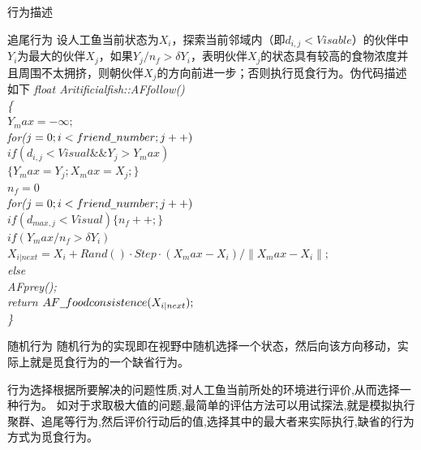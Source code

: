 \documentclass[UTF8]{ctexart}
\begin{document}
\begin{section}
\begin{subsection}{行为描述}
\begin{subsubsection}{追尾行为}
设人工鱼当前状态为$X_i$，探索当前邻域内（即$d_{i,j}<Visable$）的伙伴中$Y_i$为最大的伙伴$X_j$，如果$Y_j/n_f>\delta Y_i$，表明伙伴$X_j$的状态具有较高的食物浓度并且周围不太拥挤，则朝伙伴$X_j$的方向前进一步；否则执行觅食行为。伪代码描述如下			
\flushleft\scriptsize{\emph{float Aritificial\underline{\hspace{0.5em}}fish::AF\underline{\hspace{0.5em}}follow() \\ {\{} \\ {\qquad $Y_max=-\infty;$} \\ {\qquad for($j=0;i<friend\underline{\hspace{0.5em}}number;j++)$} \\ {\qquad\qquad $if(d_{i,j}<Visual \&\& Y_j>Y_max)$} \\ {\qquad\qquad\qquad $\{ Y_max=Y_j; X_max=X_j; \}$ }\\{\qquad $n_f=0$}\\{\qquad for($j=0;i<friend\underline{\hspace{0.5em}}number;j++)$}\\{\qquad\qquad $if(d_{max,j}<Visual) \{ n_f++;\} $}\\{\qquad $if (Y_max/n_f>\delta Y_i)$}\\{\qquad\qquad $X_{i|next}=X_i+Rand()·Step·(X_max-X_i)/\lVert X_max-X_i\rVert;$}\\{\qquad else}\\{\qquad\qquad AF\underline{\hspace{0.5em}}prey();}\\{ return $AF\underline{\hspace{0.5em}}foodconsistence(X_{i|next});$} \\{\}} }}
\end{subsubsection}

\begin{subsubsection}{随机行为}
随机行为的实现即在视野中随机选择一个状态，然后向该方向移动，实际上就是觅食行为的一个缺省行为。
\end{subsubsection}
\end{subsection}

\begin{subsection}{行为选择}根据所要解决的问题性质,对人工鱼当前所处的环境进行评价,从而选择一种行为。 如对于求取极大值的问题,最简单的评估方法可以用试探法,就是模拟执行聚群、追尾等行为,然后评价行动后的值,选择其中的最大者来实际执行,缺省的行为方式为觅食行为。
\end{subsection}
\end{section}
\end{document}
